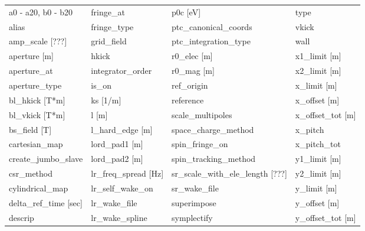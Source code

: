  \begin{tabular}{llll} \toprule
a0 - a20, b0 - b20             & fringe_at                      & p0c [eV]                       & type                           \\
alias                          & fringe_type                    & ptc_canonical_coords           & vkick                          \\
amp_scale [???]                & grid_field                     & ptc_integration_type           & wall                           \\
aperture [m]                   & hkick                          & r0_elec [m]                    & x1_limit [m]                   \\
aperture_at                    & integrator_order               & r0_mag [m]                     & x2_limit [m]                   \\
aperture_type                  & is_on                          & ref_origin                     & x_limit [m]                    \\
bl_hkick [T*m]                 & ks [1/m]                       & reference                      & x_offset [m]                   \\
bl_vkick [T*m]                 & l [m]                          & scale_multipoles               & x_offset_tot [m]               \\
bs_field [T]                   & l_hard_edge [m]                & space_charge_method            & x_pitch                        \\
cartesian_map                  & lord_pad1 [m]                  & spin_fringe_on                 & x_pitch_tot                    \\
create_jumbo_slave             & lord_pad2 [m]                  & spin_tracking_method           & y1_limit [m]                   \\
csr_method                     & lr_freq_spread [Hz]            & sr_scale_with_ele_length [???] & y2_limit [m]                   \\
cylindrical_map                & lr_self_wake_on                & sr_wake_file                   & y_limit [m]                    \\
delta_ref_time [sec]           & lr_wake_file                   & superimpose                    & y_offset [m]                   \\
descrip                        & lr_wake_spline                 & symplectify                    & y_offset_tot [m]               \\

\end{tabular}
